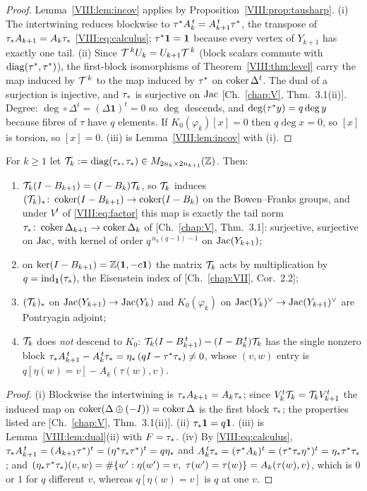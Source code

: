 \begin{proof}
Lemma~\ref{VIII:lem:incov} applies by Proposition~\ref{VIII:prop:tausharp}. (i) The intertwining
reduces blockwise to $\tau^* A_k^{\,t}=A_{k+1}^{\,t}\tau^*$, the transpose of
$\tau_* A_{k+1}=A_k\tau_*$ \eqref{VIII:eq:calculus}; $\tau^*\mathbf1=\mathbf1$ because every vertex
of $Y_{k+1}$ has exactly one tail. (ii) Since $\mathcal{T}^{\,k} U_k=U_{k+1}\mathcal{T}^{\,k}$ (block scalars
commute with $\operatorname{diag}(\tau^*,\tau^*)$), the first-block isomorphisms of
Theorem~\ref{VIII:thm:level} carry the map induced by $\mathcal{T}^{\,k}$ to the map induced by $\tau^*$ on
$\operatorname{coker}\Delta^{t}$. The dual of a surjection is injective, and $\tau_*$ is surjective on
$\operatorname{Jac}$ [Ch.~\ref{chap:V}, Thm.~3.1(ii)]. Degree: $\deg\circ\Delta^{t}=(\Delta\mathbf1)^t=0$ so $\deg$
descends, and $\deg(\tau^* y)=q\deg y$ because fibres of $\tau$ have $q$ elements. If
$K_0(\varphi_k)[x]=0$ then $q\deg x=0$, so $[x]$ is torsion, so $[x]=0$. (iii) is
Lemma~\ref{VIII:lem:incov} with (i).
\end{proof}

\begin{theorem}\label{VIII:thm:matrix}
For $k\ge1$ let $\mathcal{T}_{k}:=\operatorname{diag}(\tau_*,\tau_*)\in M_{2n_k\times2n_{k+1}}(\mathbb{Z})$. Then:
\begin{enumerate}
\item[(i)] $\mathcal{T}_{k}(I-B_{k+1})=(I-B_k)\mathcal{T}_{k}$, so $\mathcal{T}_{k}$ induces
$(\mathcal{T}_{k})_*\colon\operatorname{coker}(I-B_{k+1})\to\operatorname{coker}(I-B_k)$ on the Bowen--Franks groups, and
under $V^{t}$ of \eqref{VIII:eq:factor} this map is exactly the tail norm
$\tau_*\colon\operatorname{coker}\Delta_{k+1}\to\operatorname{coker}\Delta_k$ of {\rm[Ch.~\ref{chap:V}, Thm.~3.1]}: surjective,
surjective on $\operatorname{Jac}$, with kernel of order $q^{\,n_k(q-1)-1}$ on $\operatorname{Jac}(Y_{k+1})$;
\item[(ii)] on $\ker(I-B_{k+1})=\mathbb{Z}(\mathbf1,-c\mathbf1)$ the matrix $\mathcal{T}_{k}$ acts by
multiplication by $q=\operatorname{ind}_{\mathbf1}(\tau_*)$, the Eisenstein index of {\rm[Ch.~\ref{chap:VII}, Cor.~2.2]};
\item[(iii)] $(\mathcal{T}_{k})_*$ on $\operatorname{Jac}(Y_{k+1})\to\operatorname{Jac}(Y_k)$ and $K_0(\varphi_k)$ on
$\operatorname{Jac}(Y_k)^{\vee}\to\operatorname{Jac}(Y_{k+1})^{\vee}$ are Pontryagin adjoint;
\item[(iv)] $\mathcal{T}_{k}$ does \emph{not} descend to $K_0$: $\mathcal{T}_{k}(I-B_{k+1}^{\,t})-(I-B_k^{\,t})\mathcal{T}_{k}$
has the single nonzero block $\tau_* A_{k+1}^{\,t}-A_k^{\,t}\tau_*=\eta_*\,(qI-\tau^*\tau_*)\ne0$,
whose $(v,w)$ entry is $q[\eta(w)=v]-A_k(\tau(w),v)$.
\end{enumerate}
\end{theorem}

\begin{proof}
(i) Blockwise the intertwining is $\tau_* A_{k+1}=A_k\tau_*$; since $V_k^{t}\mathcal{T}_{k}=\mathcal{T}_{k} V_{k+1}^{t}$
the induced map on $\operatorname{coker}(\Delta\oplus(-I))=\operatorname{coker}\Delta$ is the first block $\tau_*$;
the properties listed are [Ch.~\ref{chap:V}, Thm.~3.1(ii)]. (ii) $\tau_*\mathbf1=q\mathbf1$. (iii) is
Lemma~\ref{VIII:lem:dual}(ii) with $F=\tau_*$. (iv) By \eqref{VIII:eq:calculus},
$\tau_* A_{k+1}^{\,t}=(A_{k+1}\tau^*)^{t}=(\eta^*\tau_*\tau^*)^{t}=q\eta_*$ and
$A_k^{\,t}\tau_*=(\tau^* A_k)^{t}=(\tau^*\tau_*\eta^*)^{t}=\eta_*\tau^*\tau_*$; and
$(\et\taup\ta)(v,w)=\#\{w':\eta(w')=v,\ \tau(w')=\tau(w)\}=A_k(\tau(w),v)$, which is
$0$ or $1$ for $q$ different $v$, whereas $q[\eta(w)=v]$ is $q$ at one $v$.
\end{proof}

